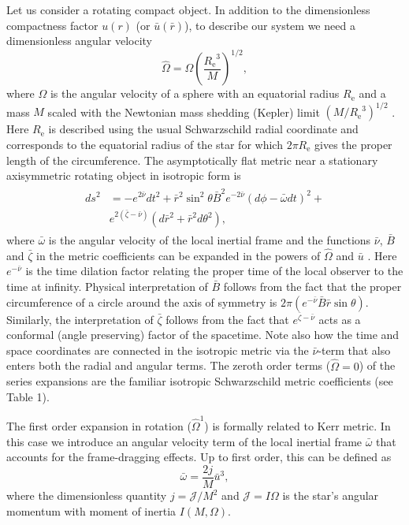 \documentclass{aa}
\newcommand{\be}{\begin{equation}}
\newcommand{\ee}{\end{equation}}
\newcommand{\Req}{\ensuremath{R_{\mathrm{e}}}}
\newcommand{\sch}{Schwarzschild }
\newcommand{\rb}{\ensuremath{\bar{r}}}
\newcommand{\ub}{\ensuremath{\bar{u}}}
\newcommand{\wb}{\ensuremath{\bar{\omega}}}
\newcommand{\Ob}{\ensuremath{\hat{\Omega}}}
\newcommand{\nub}{\ensuremath{\bar{\nu}}}
\newcommand{\zetab}{\ensuremath{\bar{\zeta}}}
\newcommand{\Bb}{\ensuremath{\bar{B}}}
\begin{document}
Let us consider a rotating compact object.
In addition to the dimensionless compactness factor $u(r)$ (or $\ub(\rb)$), to describe our system we need a dimensionless angular velocity
\be
\Ob = \Omega \left( \frac{\Req^3}{M} \right)^{1/2},
\ee
where $\Omega$ is the angular velocity of a sphere with an equatorial radius $\Req$ and a mass $M$ scaled with the Newtonian mass shedding (Kepler) limit $(M/\Req^3)^{1/2}$ \citep[see][p.29]{rcs}.  
Here $\Req$ is described using the usual \sch radial coordinate and corresponds to the equatorial radius of the star for which $2\pi\Req$ gives the proper length of the circumference.  
The asymptotically flat metric near a stationary axisymmetric rotating object in isotropic form is \citep{BW71} 
\begin{align}\begin{split} \label{eq:BWmetric}
ds^2 & = -e^{2\nub} dt^2 +
     \rb^2 \sin^2\theta \Bb^2 e^{-2\nub}(d\phi - \wb dt)^2 + \\
     & e^{2(\zetab-\nub)}(d\rb^2 + \rb^2d\theta^2),
\end{split}\end{align}
where $\wb$ is the angular velocity of the local inertial frame and the functions $\nub$, $\Bb$ and $\zetab$ in the metric coefficients can be expanded in the powers of $\Ob$ and $\ub$ \citep{BI76}.
Here $e^{-\nub}$ is the time dilation factor relating the proper time of the local observer to the time at infinity.
Physical interpretation of $\Bb$ follows from the fact that the proper circumference of a circle around the axis of symmetry is $2\pi(e^{-\nub} \Bb \rb \sin\theta)$.
Similarly, the interpretation of $\zetab$ follows from the fact that $e^{\zetab - \nub}$ acts as a conformal (angle preserving) factor of the spacetime. %
Note also how the time and space coordinates are connected in the isotropic metric via the $\nub$-term that also enters both the radial and angular terms.
The zeroth order terms ($\Ob = 0$) of the series expansions are the familiar isotropic \sch metric coefficients (see Table 1).

The first order expansion in rotation ($\Ob^1$) is formally related to Kerr metric.
In this case we introduce an angular velocity term of the local inertial frame $\wb$ that accounts for the frame-dragging effects. 
Up to first order, this can be defined as
\be\label{eq:wbar}
\wb = \frac{2 j}{M}\ub^3,
\ee
where the dimensionless quantity $j=\mathcal{J}/M^2$ and $\mathcal{J} = I \Omega$ is the star's angular momentum with moment of inertia $I(M,\Omega)$.
\end{document}
